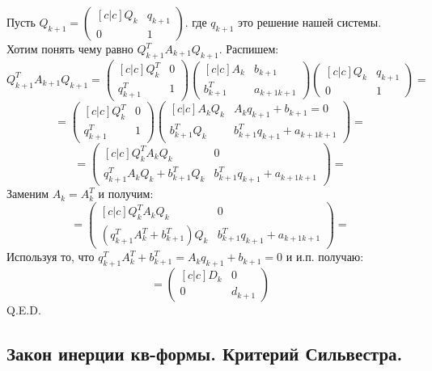 Пусть $Q_{k+1} = \begin{pmatrix}[c|c]
    Q_k& q_{k+1}\\
    \hline  0 & 1
\end{pmatrix}$. где $q_{k+1}$ это решение нашей системы. Хотим понять чему равно
$Q_{k+1}^T A_{k+1}Q_{k+1}$. Распишем:
$$Q_{k+1}^T A_{k+1}Q_{k+1} =\begin{pmatrix}[c|c]
    Q_k^T& 0\\
    \hline  q_{k+1}^T & 1
\end{pmatrix} \begin{pmatrix}[c|c]
    A_k& b_{k+1}\\
    \hline  b_{k+1}^T & a_{k+1 k+1}
\end{pmatrix} \begin{pmatrix}[c|c]
    Q_k& q_{k+1}\\
    \hline  0 & 1
\end{pmatrix}  =$$ $$=\begin{pmatrix}[c|c]
    Q_k^T& 0\\
    \hline  q_{k+1}^T & 1
\end{pmatrix}  \begin{pmatrix}[c|c]
    A_k Q_k& A_k q_{k+1} + b_{k+1} = 0\\
    \hline  b_{k+1}^T Q_k & b_{k+1}^Tq_{k+1} + a_{k+1 k+1}
\end{pmatrix} =$$
$$= \begin{pmatrix}[c|c]
    Q_k^TA_k Q_k& 0\\
    \hline  q_{k+1}^TA_kQ_k + b_{k+1}^T Q_k& b_{k+1}^Tq_{k+1} + a_{k+1 k+1}
\end{pmatrix} =$$
Заменим $A_k = A_k^T$ и получим:
$$=\begin{pmatrix}[c|c]
    Q_k^TA_k Q_k& 0\\
    \hline  (q_{k+1}^TA^T_k + b_{k+1}^T) Q_k& b_{k+1}^Tq_{k+1} + a_{k+1 k+1}
\end{pmatrix} = $$
Используя то, что $q_{k+1}^TA^T_k + b_{k+1}^T = A_kq_{k+1} + b_{k+1} = 0$ и и.п. получаю:
$$=\begin{pmatrix}[c|c]
     D_k& 0\\
    \hline  0 & d_{k+1}
\end{pmatrix} $$
\hfill Q.E.D.
\newpage

\subsection{Закон инерции кв-формы. Критерий Сильвестра.}



